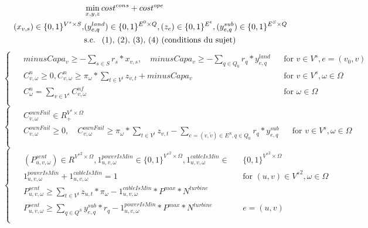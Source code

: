 \documentclass[a4paper,12pt]{article}
\begin{document}
    \begin{align*}
        & \min_{x,y,z} cost^{cons}+ cost ^{ope} \\
         (x_{v,s}) \in \{0,1\}^{V^{s} \times S}, & (y_{e,q}^{land}) \in \{0,1\}^{E^0 \times Q}, (z_{e})\in \{0,1\}^{E^t}, (y_{e,q}^{sub}) \in \{0,1\}^{E^S\times Q}\\
        & \text{s.c. \text{ (1), (2), (3), (4)  (conditions du sujet)}} 
    \end{align*}
    \begin{equation}
        \begin{cases}
            \begin{alignedat}{2}
                & minusCapa_v \geq - \sum_{s \in S} r_s * x_{v,s}, \quad minusCapa_v \geq - \sum_{q \in Q_0} r_q * y_{e,q}^{land}  &&  \text{for } v \in V^s, e = (v_0, v)  \\
                & C_{v,\omega}^{n} \geq 0, C_{v,\omega}^{n} \geq \pi_\omega * \sum_{t \in V^t} z_{v,t} + minusCapa_v  &&  \text{for } v \in V^s, \omega \in \Omega  \\
                & C^n_{\omega} = \sum_{v \in V^s} C_{v,\omega}^{nf} && \text{for } \omega \in \Omega \\
            \end{alignedat}
        \end{cases}
    \end{equation}
    \begin{equation}
        \begin{cases}
            \begin{alignedat}{2}
                & C_{v, \omega}^{ownFail} \in R^{V^s \times \Omega}_+ \\
                & C_{v, \omega}^{ownFail} \geq 0, \quad C_{v, \omega}^{ownFail} \geq \pi_\omega * \sum_{t \in V^t} z_{v,t} - \sum_{e = (v, \tilde{v}) \in E^S , q \in Q_0} r_q * y_{e,q}^{sub}  &&  \text{for } v \in V^s, \omega \in \Omega \\
            \end{alignedat}
        \end{cases}
    \end{equation}
    \begin{equation}
        \begin{cases}
            \begin{alignedat}{2}
                & (P_{u,v,\omega}^{sent}) \in R^{{V^s}^2 \times \Omega}, 1_{u,v,\omega}^{powerIsMin} \in \{0,1\}^{{V^{s}}^2 \times \Omega},  1_{u,v,\omega}^{cableIsMin} \in && \{0,1\}^{{V^{s}}^2 \times \Omega} \\
                & 1_{u,v,\omega}^{powerIsMin} + 1_{u,v,\omega}^{cableIsMin} = 1 && \text{for } (u,v) \in {V^s}^2, \omega \in \Omega \\
                & P_{u,v,\omega}^{sent} \geq \sum_{t \in V^t} z_{u,t} * \pi_\omega - 1_{u,v,\omega}^{cableIsMin} * P^{max} * N^{turbine} \\
                & P_{u, v, \omega}^{sent} \geq  \sum_{q \in Q^S} y_{e,q}^{sub} * r_q - 1_{u, v, \omega}^{powerIsMin} * P^{max} * N^{turbine} && e = (u, v) \\
            \end{alignedat}
        \end{cases}
    \end{equation}
\end{document}
